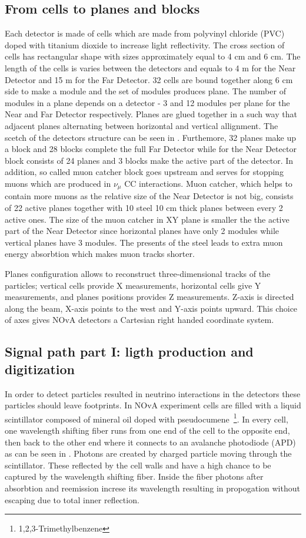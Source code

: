 \subsection{From cells to planes and blocks}
Each detector is made of cells which are made from polyvinyl chloride (PVC) doped with titanium 
dioxide to increase light reflectivity. The cross section of cells has rectangular shape with sizes
approximately equal to 4 cm and 6 cm. The length of the cells is varies between the detectors and 
equals to 4 m for the Near Detector and 15 m for the Far Detector. 32 cells are bound together along
6 cm side to make a module and the set of modules produces plane. The number of modules in a plane
depends on a detector - 3 and 12 modules per plane for the Near and Far Detector respectively. Planes
are glued together in a such way that adjacent planes alternating between horizontal and vertical
allignment. The scetch of the detectors structure can be seen in . Furthemore, 32 planes 
make up a block and 28 blocks complete the full Far Detector while for the Near Detector block consists
of 24 planes and 3 blocks make the active part of the detector. In addition, so called muon catcher
block goes upstream and serves for stopping muons which are produced in $\nu_\mu$ CC interactions. 
Muon catcher, which helps to contain more muons as the relative size of the Near Detector is not big, 
consists of 22 active planes together with 10 steel 10 cm thick planes between every 2 active ones. The size
of the muon catcher in XY plane is smaller the the active part of the Near Detector since horizontal
planes have only 2 modules while vertical planes have 3 modules. The presents of the steel leads to
extra muon energy absorbtion which makes muon tracks shorter.

Planes configuration allows to reconstruct three-dimensional tracks of the particles; vertical cells 
provide X measurements, horizontal cells give Y measurements, and planes positions provides Z measurements. 
Z-axis is directed along the beam, X-axis points to the west and Y-axis points upward. This choice of
axes gives NOvA detectors a Cartesian right handed coordinate system. 

\subsection{Signal path part I: ligth production and digitization}
In order to detect particles resulted in neutrino interactions in the detectors these particles 
should leave footprints. In NOvA experiment cells are filled with a liquid scintillator composed 
of mineral oil doped with pseudocumene~\footnote{1,2,3-Trimethylbenzene}. In every cell, one wavelength 
shifting fiber runs from one end of the cell to the opposite end, then back to the other end where 
it connects to an avalanche photodiode (APD) as can be seen in . Photons are created by charged 
particle moving through the scintillator. These reflected by the cell walls and have a high chance 
to be captured by the wavelength shifting fiber. Inside the fiber photons after absorbtion and
reemission increse its wavelength resulting in propogation without escaping due to total inner
reflection. 

